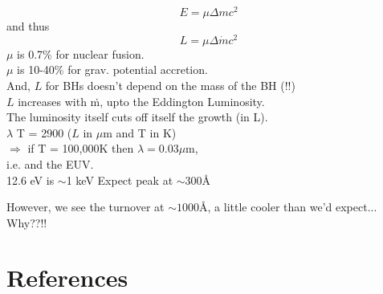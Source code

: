 \documentclass[11pt]{article}
\begin{document}
\begin{equation}
 E = \mu \Delta m c^{2} 
\end{equation}
and thus
\begin{equation}
 L = \mu \Delta \dot{m} c^{2} 
\end{equation}
$\mu$ is 0.7\% for nuclear fusion. \\
$\mu$ is 10-40\% for grav. potential accretion.  \\
And, $L$ for BHs doesn't depend on the mass of the BH (!!) \\

$L$ increases with \.m, upto the Eddington Luminosity. \\
The luminosity itself cuts off itself the growth (in L). \\

$\lambda$  T = 2900 ($L$ in $\mu$m and T in K)\\
$\Rightarrow$ if T = 100,000K then $\lambda=0.03\mu$m, \\
i.e. and the EUV. \\
12.6 eV is $\sim$1 keV
Expect peak at $\sim300$\AA

However, we see the turnover at $\sim1000$\AA, 
a little cooler than we'd expect... Why??!!





\section{References}
\citet{Ross07}



\end{document}
